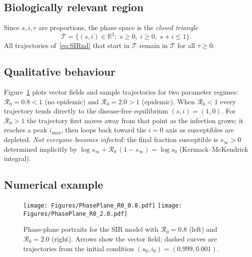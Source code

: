 \documentclass[11pt]{article}
\newcommand{\R}{\mathbb{R}}
\newcommand{\RR}{\mathcal{R}_0}
\begin{document}
\subsection*{Biologically relevant region}
Since $s,i,r$ are proportions, the phase space is the
\emph{closed triangle}
\[
\mathcal T=\{(s,i)\in\R^2:\; s\ge0,\; i\ge0,\; s+i\le1\}.
\]
All trajectories of~\cref{eq:SIRnd} that start in $\mathcal T$
remain in $\mathcal T$ for all $\tau\ge0$.

\subsection*{Qualitative behaviour}
Figure~\cref{fig:phaseplane} plots vector fields and sample trajectories
for two parameter regimes:
$\RR=0.8<1$ (no epidemic) and $\RR=2.0>1$ (epidemic).
When $\RR<1$ every trajectory tends directly to the
disease-free equilibrium $(s,i)=(1,0)$.
For $\RR>1$ the trajectory first moves away from that point
as the infection grows; it reaches a peak $i_{\max}$, then
loops back toward the $i=0$ axis as susceptibles are depleted.
\emph{Not everyone becomes infected:} the final fraction susceptible
is $s_{\infty}>0$ determined implicitly by
\(\log s_{\infty} + \RR\,(1-s_{\infty})=\log s_{0}\)
(Kermack–McKendrick integral).

\subsection*{Numerical example}
\begin{figure}[H]
\centering
\texttt{[image: Figures/PhasePlane\_R0\_0.8.pdf]}
\texttt{[image: Figures/PhasePlane\_R0\_2.0.pdf]}
\caption{Phase-plane portraits for the SIR model
with $\RR=0.8$ (left) and $\RR=2.0$ (right).
Arrows show the vector field; dashed curves are trajectories
from the initial condition $(s_0,i_0)=(0.999,0.001)$.}
\label{fig:phaseplane}
\end{figure}



\end{document}
